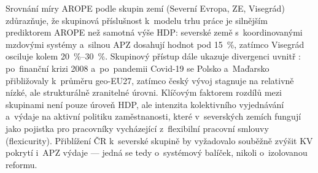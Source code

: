 Srovnání míry \ac{AROPE} podle skupin zemí (Severní Evropa, ZE, Visegrád) zdůrazňuje, že skupinová příslušnost k~modelu trhu práce je silnějším prediktorem \ac{AROPE} než samotná výše \ac{HDP}: severské země s~koordinovanými mzdovými systémy a~silnou \ac{APZ} dosahují hodnot pod \SI{15}{\percent}, zatímco Visegrád osciluje kolem \SIrange{20}{30}{\percent}.
Skupinový přístup dále ukazuje divergenci uvnitř : po~finanční krizi 2008 a~po~pandemii Covid-19 se Polsko a~Maďarsko přibližovaly k~průměru \acs{geo-EU27}, zatímco český vývoj stagnuje na relativně nízké, ale strukturálně zranitelné úrovni.
Klíčovým faktorem rozdílů mezi skupinami není pouze úroveň \ac{HDP}, ale intenzita kolektivního vyjednávání a~výdaje na aktivní politiku zaměstnanosti, které v~severských zemích fungují jako pojistka pro pracovníky vycházející z~flexibilní pracovní smlouvy (flexicurity).
Přiblížení ČR k~severské skupině by vyžadovalo souběžně zvýšit \ac{KV} pokrytí i~\ac{APZ} výdaje --- jedná se tedy o~systémový balíček, nikoli o~izolovanou reformu.


